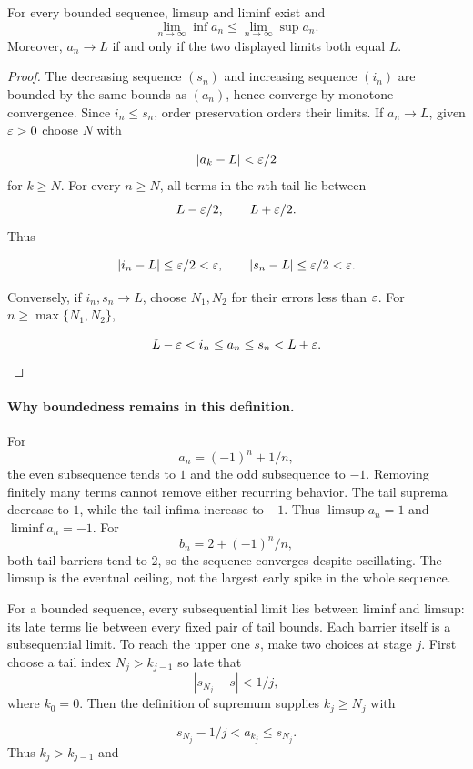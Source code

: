 \begin{theorem}
\label{thm:limsup-liminf}
For every bounded sequence, limsup and liminf exist and
\[
\lim_{n\to\infty}\inf a_n\leq\lim_{n\to\infty}\sup a_n.
\]
Moreover, $a_n\to L$ if and only if the two displayed limits both equal $L$.
\end{theorem}
\begin{proof}
The decreasing sequence $(s_n)$ and increasing sequence $(i_n)$ are
bounded by the same bounds as $(a_n)$, hence converge by monotone
convergence. Since $i_n\leq s_n$, order preservation orders their limits.
If $a_n\to L$, given $\varepsilon>0$ choose $N$ with

\[
|a_k-L|<\varepsilon/2
\]
 for $k\geq N$. For every $n\geq N$, all terms in
the $n$th tail lie between
\[
L-\varepsilon/2,\qquad L+\varepsilon/2.
\]
 Thus

\[
|i_n-L|\leq\varepsilon/2<\varepsilon,\qquad |s_n-L|\leq\varepsilon/2<\varepsilon.
\]

Conversely, if $i_n,s_n\to L$, choose $N_1,N_2$ for their errors
less than $\varepsilon$. For $n\geq\max\{N_1,N_2\}$,

\[
L-\varepsilon<i_n\leq a_n\leq s_n<L+\varepsilon.
\]

\end{proof}

\paragraph{Why boundedness remains in this definition.}
\begin{example}
For
\[
a_n=(-1)^n+1/n,
\]
 the even subsequence tends to $1$ and the odd
subsequence to $-1$. Removing finitely many terms cannot remove either
recurring behavior. The tail suprema decrease to $1$, while the tail
infima increase to $-1$. Thus $\limsup a_n=1$ and $\liminf a_n=-1$.
For
\[
b_n=2+(-1)^n/n,
\]
 both tail barriers tend to $2$, so the sequence
converges despite oscillating. The limsup is the eventual ceiling,
not the largest early spike in the whole sequence.
\end{example}
For a bounded sequence, every subsequential limit lies between liminf and
limsup: its late terms lie between every fixed pair of tail bounds.
Each barrier itself is a subsequential limit. To reach the upper one $s$,
make two choices at stage $j$. First choose a tail index $N_j>k_{j-1}$
so late that
\[
|s_{N_j}-s|<1/j,
\]
 where $k_0=0$. Then the definition of
supremum supplies $k_j\geq N_j$ with

\[
s_{N_j}-1/j<a_{k_j}\leq s_{N_j}.
\]
 Thus $k_j>k_{j-1}$ and

